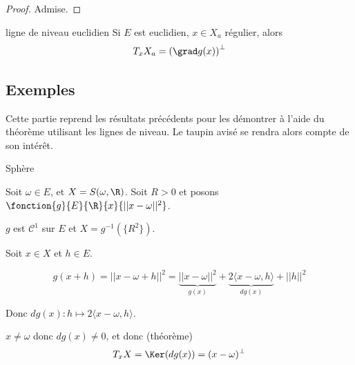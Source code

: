 \begin{proof}
    Admise. 
\end{proof}

\begin{corollaire}{ligne de niveau euclidien}{}
    Si $E$ est euclidien, $x \in X_a$ régulier, alors 
    $$T_xX_a = \left(\grad g(x) \right)^\perp$$
\end{corollaire}

\subsection{Exemples}

Cette partie reprend les résultats précédents pour les démontrer à l'aide du théorème utilisant les 
lignes de niveau. Le taupin avisé se rendra alors compte de son intérêt.

\begin{exemple}
    Sphère 

    Soit $\omega \in E$, et $X = S(\omega, \R)$. 
    Soit $R > 0$ et posons $\fonction{g}{E}{\R}{x}{||x - \omega||^2}$.

    $g$ est $\mathscr C^1$ sur $E$ et $X = g^{-1}(\{R^2\})$.

    Soit $x \in X$ et $h \in E$. 

    $$g(x + h) = ||x - \omega + h ||^2 = \underbrace{||x- \omega||^2}_{g(x)} + \underbrace{2 \langle x - \omega, h \rangle}_{dg(x)} + ||h||^2$$

    Donc $dg(x) : h \mapsto 2 \langle x - \omega, h \rangle$.

    $x \neq \omega$ donc $dg(x) \neq 0$, et donc (théorème)
    $$T_xX = \Ker(dg(x)) = (x - \omega)^\perp$$
\end{exemple}

